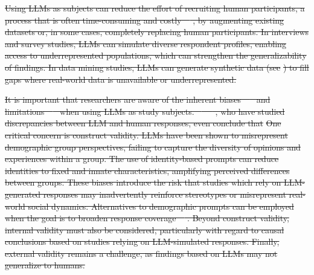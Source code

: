 \documentclass[smallextended]{svjour3}
\newcommand*{\enq}[1]{\enquote{{\itshape#1}}}
\newcommand{\synthesis}{\hyperref[sec:llms-for-synthesis]{\emph{LLMs for Synthesis}}\xspace}
\newcommand{\studytypeparagraph}[1]{\paragraph{\bfseries #1:}}
\providecommand{\DIFdeltex}[1]{{\protect\color{red}\sout{#1}}}                      %
\providecommand{\DIFdelbegin}{} %
\providecommand{\DIFdel}[1]{\texorpdfstring{\DIFdeltex{#1}}{}} %
\newcommand{\DIFscaledelfig}{0.5}
\newlength{\DIFdelgraphicswidth} %
\newlength{\DIFdelgraphicsheight} %
\newcommand{\DIFdelincludegraphics}[2][]{%
\sbox{\DIFdelgraphicsbox}{\DIFOincludegraphics[#1]{#2}}%
\settoboxwidth{\DIFdelgraphicswidth}{\DIFdelgraphicsbox} %
\settoboxtotalheight{\DIFdelgraphicsheight}{\DIFdelgraphicsbox} %
\scalebox{\DIFscaledelfig}{%
\parbox[b]{\DIFdelgraphicswidth}{\usebox{\DIFdelgraphicsbox}\\[-\baselineskip] \rule{\DIFdelgraphicswidth}{0em}}\llap{\resizebox{\DIFdelgraphicswidth}{\DIFdelgraphicsheight}{%
\setlength{\unitlength}{\DIFdelgraphicswidth}%
\begin{picture}(1,1)%
\thicklines\linethickness{2pt} %
{\color[rgb]{1,0,0}\put(0,0){\framebox(1,1){}}}%
{\color[rgb]{1,0,0}\put(0,0){\line( 1,1){1}}}%
{\color[rgb]{1,0,0}\put(0,1){\line(1,-1){1}}}%
\end{picture}%
}\hspace*{3pt}}} %
} %
\DeclareRobustCommand{\DIFdelbegin}{\DIFOdelbegin \let\includegraphics\DIFdelincludegraphics} %
\begin{document}
\DIFdelbegin %

\DIFdel{Using LLMs as subjects can reduce the effort of recruiting human participants, a process that is often time-consuming and costly~\mbox{%
\cite{DBLP:conf/vl/Madampe0HO24}}\hskip0pt%
, by augmenting existing datasets or, in some cases, completely replacing human participants. 
In interviews and survey studies, LLMs can simulate diverse respondent profiles, enabling access to underrepresented populations, which can strengthen the generalizability of findings. 
In data mining studies, LLMs can generate synthetic data (see }%
\DIFdel{) to fill gaps where real-world data is unavailable or underrepresented.
}%


\DIFdel{It is important that researchers are aware of the inherent biases~\mbox{%
\cite{Crowell2023} }\hskip0pt%
and limitations~\mbox{%
\cite{DBLP:journals/ais/HardingDLL24, DBLP:journals/corr/abs-2402-01908} }\hskip0pt%
when using LLMs as study subjects. 
\mbox{%
\citeauthor{schroeder2025llmspsychology}}\hskip0pt%
~\mbox{%
\cite{schroeder2025llmspsychology}}\hskip0pt%
, who have studied discrepancies between LLM and human responses, even conclude that }%
\DIFdel{One critical concern is construct validity.
LLMs have been shown to misrepresent demographic group perspectives, failing to capture the diversity of opinions and experiences within a group.
The use of identity-based prompts can reduce identities to fixed and innate characteristics, amplifying perceived differences between groups.
These biases introduce the risk that studies which rely on LLM-generated responses may inadvertently reinforce stereotypes or misrepresent real-world social dynamics.
Alternatives to demographic prompts can be employed when the goal is to broaden response coverage~\mbox{%
\cite{DBLP:journals/corr/abs-2402-01908}}\hskip0pt%
.
Beyond construct validity, internal validity must also be considered, particularly with regard to causal conclusions based on studies relying on LLM-simulated responses.
 Finally, external validity remains a challenge, as findings based on LLMs may not generalize to humans.
 }%
\end{document}
